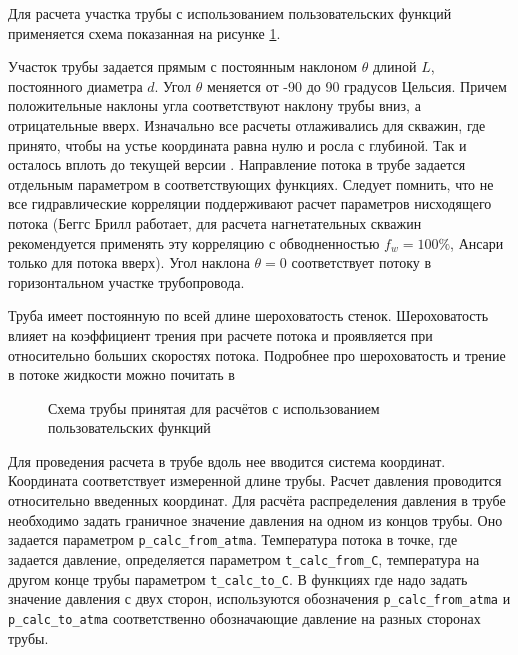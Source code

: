 Для расчета участка трубы с использованием пользовательских функций \unf{} применяется схема показанная на рисунке \ref{ris:Pipe_scheme_1}.

Участок трубы задается прямым с постоянным наклоном $\theta$  длиной $L$, постоянного диаметра $d$. Угол  $\theta$ меняется от -90 до 90 градусов Цельсия. Причем положительные наклоны угла соответствуют наклону трубы вниз, а отрицательные вверх. Изначально все расчеты отлаживались для скважин, где принято, чтобы на устье координата равна нулю и росла с глубиной. Так и осталось вплоть до текущей версии \unf{}.  Направление потока в трубе задается отдельным параметром в соответствующих функциях. Следует помнить, что не все гидравлические корреляции поддерживают расчет параметров нисходящего потока (Беггс Брилл работает, для расчета нагнетательных скважин рекомендуется применять эту корреляцию с обводненностью $f_w = 100\% $, Ансари только для потока вверх). Угол наклона $\theta = 0 $ соответствует потоку в горизонтальном участке трубопровода.

Труба имеет постоянную по всей длине шероховатость стенок. Шероховатость влияет на коэффициент трения при расчете потока и проявляется при относительно больших скоростях потока. Подробнее про шероховатость и трение в потоке жидкости можно почитать в \cite{Bratland_Pipe_Flow_1}

\begin{figure}[h!]
	\begin{center}
		
		\caption{Схема трубы принятая для расчётов с использованием пользовательских функций}
		\label{ris:Pipe_scheme_1}
	\end{center}
\end{figure}

Для проведения расчета в трубе вдоль нее вводится система координат. Координата соответствует измеренной длине трубы. Расчет давления проводится относительно введенных координат. 
Для расчёта распределения давления в трубе необходимо задать граничное значение давления на одном из концов трубы. Оно задается параметром  \texttt{p_calc_from_atma}. Температура потока в точке, где задается давление, определяется параметром  \texttt{t_calc_from_C}, температура на другом конце трубы  параметром \texttt{t_calc_to_C}.  В функциях где надо задать значение давления с двух сторон, используются обозначения \texttt{p_calc_from_atma} и \texttt{p_calc_to_atma} соответственно обозначающие давление на разных сторонах трубы. 



